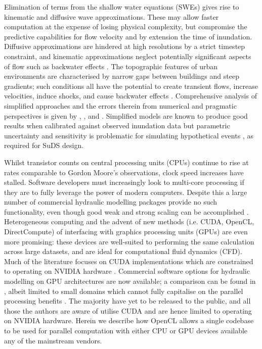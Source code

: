 \documentclass[11pt,english,a4paper]{article}
\begin{document}
Elimination of terms from the shallow water equations (SWEs) gives rise to kinematic and diffusive wave approximations. These may allow faster computation at the expense of losing physical complexity, but compromise the predictive capabilities for flow velocity and by extension the time of inundation. Diffusive approximations are hindered at high resolutions by a strict timestep constraint, and kinematic approximations neglect potentially significant aspects of flow such as backwater effects \citep{Bates2000,Tsai2003,Hunter2005}. The topographic features of urban environments are characterised by narrow gaps between buildings and steep gradients; such conditions all have the potential to create transient flows, increase velocities, induce shocks, and cause backwater effects \citep{Testa2007,ElKadiAbderrezzak2011,Xia2011}. Comprehensive analysis of simplified approaches and the errors therein from numerical and pragmatic perspectives is given by \citet{Singh1996a}, \citet{Hunter2007}, and \citet{Pender2010,Pender2013}. Simplified models are known to produce good results when calibrated against observed inundation data \citep[e.g.][]{Neal2009,Horritt2010} but parametric uncertainty and sensitivity is problematic for simulating hypothetical events \citep{Horritt2002,Yu2006,Fewtrell2008a}, as required for SuDS design.

Whilst transistor counts on central processing units (CPUs) continue to rise at rates comparable to Gordon Moore's observations, clock speed increases have stalled. Software developers must increasingly look to multi-core processing if they are to fully leverage the power of modern computers. Despite this a large number of commercial hydraulic modelling packages provide no such functionality, even though good weak and strong scaling can be accomplished \citep{Sanders2010,Kalyanapu2011,Sætra2012a}. Heterogeneous computing and the advent of new methods (i.e. CUDA, OpenCL, DirectCompute) of interfacing with graphics processing units (GPUs) are even more promising: these devices are well-suited to performing the same calculation across large datasets, and are ideal for computational fluid dynamics (CFD). Much of the literature focuses on CUDA implementations which are constrained to operating on NVIDIA hardware \citep[e.g.][]{Kuo2011,Sætra2012a}. Commercial software options for hydraulic modelling on GPU architectures are now available; a comparison can be found in \citet{Pender2013}, albeit limited to small domains which cannot fully capitalise on the parallel processing benefits \citep{Sætra2012a}. The majority have yet to be released to the public, and all those the authors are aware of utilise CUDA and are hence limited to operating on NVIDIA hardware. Herein we describe how OpenCL allows a single codebase to be used for parallel computation with either CPU or GPU devices available any of the mainstream vendors. 
\end{document}
